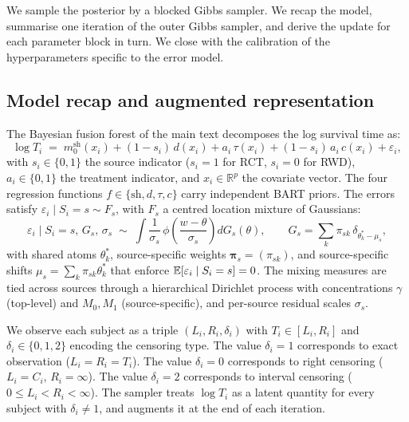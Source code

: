 We sample the posterior by a blocked Gibbs sampler.
We recap the model, summarise one iteration of the outer Gibbs sampler, and derive the update for each parameter block in turn.
We close with the calibration of the hyperparameters specific to the error model.

\subsection{Model recap and augmented representation}

The Bayesian fusion forest of the main text decomposes the log survival time as:
\begin{equation}
\log T_i \;=\; m_0^{\mathrm{sh}}(x_i) + (1 - s_i)\, d(x_i) + a_i\, \tau(x_i) + (1 - s_i)\, a_i\, c(x_i) + \varepsilon_i,
\label{eq:sm-aft}
\end{equation}
with $s_i \in \{0, 1\}$ the source indicator ($s_i = 1$ for RCT, $s_i = 0$ for RWD), $a_i \in \{0, 1\}$ the treatment indicator, and $x_i \in \mathbb{R}^p$ the covariate vector.
The four regression functions $f \in \{\mathrm{sh}, d, \tau, c\}$ carry independent BART priors.
The errors satisfy $\varepsilon_i \mid S_i = s \sim F_s$, with $F_s$ a centred location mixture of Gaussians:
\begin{equation}
\varepsilon_i \mid S_i = s,\, G_s,\, \sigma_s \;\sim\; \int \frac{1}{\sigma_s}\, \phi\!\left(\frac{w - \theta}{\sigma_s}\right) dG_s(\theta), \qquad G_s = \sum_{k} \pi_{sk}\, \delta_{\theta_k^* - \mu_s},
\end{equation}
with shared atoms $\theta_k^*$, source-specific weights $\bm{\pi}_s = (\pi_{sk})$, and source-specific shifts $\mu_s = \sum_k \pi_{sk} \theta_k^*$ that enforce $\mathbb{E}[\varepsilon_i \mid S_i = s] = 0$.
The mixing measures are tied across sources through a hierarchical Dirichlet process with concentrations $\gamma$ (top-level) and $M_0, M_1$ (source-specific), and per-source residual scales $\sigma_s$.

We observe each subject as a triple $(L_i, R_i, \delta_i)$ with $T_i \in [L_i, R_i]$ and $\delta_i \in \{0, 1, 2\}$ encoding the censoring type.
The value $\delta_i = 1$ corresponds to exact observation ($L_i = R_i = T_i$).
The value $\delta_i = 0$ corresponds to right censoring ($L_i = C_i$, $R_i = \infty$).
The value $\delta_i = 2$ corresponds to interval censoring ($0 \leq L_i < R_i < \infty$).
The sampler treats $\log T_i$ as a latent quantity for every subject with $\delta_i \neq 1$, and augments it at the end of each iteration.

